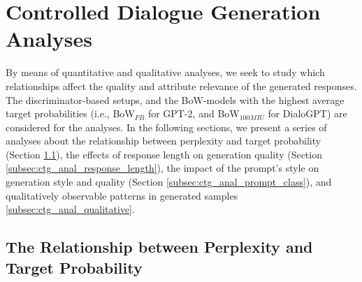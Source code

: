 










\section{Controlled Dialogue Generation Analyses}
\label{sec:exp2_analyses}

By means of quantitative and qualitative analyses, we seek to study which relationships affect the quality and attribute relevance of the generated responses. The discriminator-based setups, and the BoW-models with the highest average target probabilities (i.e., BoW$_{FB}$ for GPT-2, and BoW$_{100MIU}$ for DialoGPT) are considered for the analyses. In the following sections, we present a series of analyses about the relationship between perplexity and target probability (Section \ref{subsec:ctg_anal_ppl_target_prob}), the effects of response length on generation quality (Section \ref{subsec:ctg_anal_response_length}), the impact of the prompt's style on generation style and quality (Section \ref{subsec:ctg_anal_prompt_class}), and qualitatively observable patterns in generated samples \ref{subsec:ctg_anal_qualitative}.




\subsection{The Relationship between Perplexity and Target Probability}
\label{subsec:ctg_anal_ppl_target_prob}


